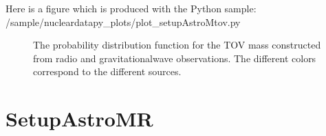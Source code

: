 \documentclass[letterpaper,10pt,english]{sphinxmanual}
\begin{document}
\sphinxAtStartPar
Here is a figure which is produced with the Python sample: /sample/nucleardatapy\_plots/plot\_setupAstroMtov.py

\begin{figure}[htbp]
\centering
\capstart

\noindent{}
\caption{The probability distribution function for the TOV mass constructed from radio and gravitational\sphinxhyphen{}wave observations.
The different colors correspond to the different sources.}\label{\detokenize{source/api/setup_astro_mtov:id1}}\end{figure}

\sphinxstepscope


\section{SetupAstroMR}
\label{\detokenize{source/api/setup_astro_mr:setupastromr}}\label{\detokenize{source/api/setup_astro_mr::doc}}\label{\detokenize{source/api/setup_astro_mr:module-nucleardatapy.setup_astro_mr}}
\end{document}
